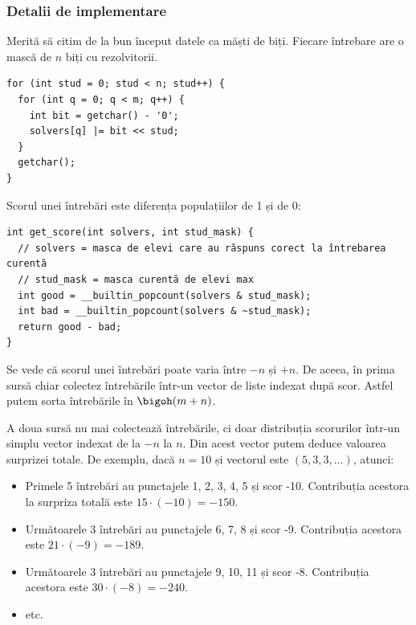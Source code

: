 \subsubsection*{Detalii de implementare}

Merită să citim de la bun început datele ca măști de biți. Fiecare întrebare are o mască de $n$ biți cu rezolvitorii.

\begin{verbatim}
for (int stud = 0; stud < n; stud++) {
  for (int q = 0; q < m; q++) {
    int bit = getchar() - '0';
    solvers[q] |= bit << stud;
  }
  getchar();
}
\end{verbatim}

Scorul unei întrebări este diferența populațiilor de 1 și de 0:

\begin{verbatim}
int get_score(int solvers, int stud_mask) {
  // solvers = masca de elevi care au răspuns corect la întrebarea curentă
  // stud_mask = masca curentă de elevi max
  int good = __builtin_popcount(solvers & stud_mask);
  int bad = __builtin_popcount(solvers & ~stud_mask);
  return good - bad;
}
\end{verbatim}

Se vede că scorul unei întrebări poate varia între $-n$ și $+n$. De aceea, în prima sursă chiar colectez întrebările într-un vector de liste indexat după scor. Astfel putem sorta întrebările în $\bigoh(m + n)$.

A doua sursă nu mai colectează întrebările, ci doar distribuția scorurilor într-un simplu vector indexat de la $-n$ la $n$. Din acest vector putem deduce valoarea surprizei totale. De exemplu, dacă $n=10$ și vectorul este $(5, 3, 3, \dots)$, atunci:

\begin{itemize}
  \item Primele 5 întrebări au punctajele 1, 2, 3, 4, 5 și scor -10. Contribuția acestora la surpriza totală este $15 \cdot (-10) = -150$.

  \item Următoarele 3 întrebări au punctajele 6, 7, 8 și scor -9. Contribuția acestora este $21 \cdot (-9) = -189$.

  \item Următoarele 3 întrebări au punctajele 9, 10, 11 și scor -8. Contribuția acestora este $30 \cdot (-8) = -240$.

  \item etc.
\end{itemize}

